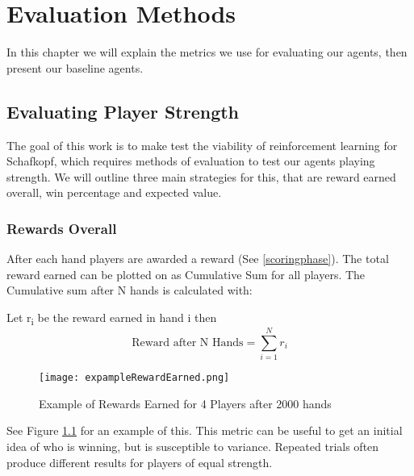 \chapter{Evaluation Methods}
In this chapter we will explain the metrics we use for evaluating our agents, then present our baseline agents.


\section{Evaluating Player Strength}
The goal of this work is to make test the viability of reinforcement learning for Schafkopf, which requires methods
of evaluation to test our agents playing strength.
We will outline three main strategies for this, that are reward earned overall, win percentage and expected value.

\subsection{Rewards Overall}
After each hand players are awarded a reward (See \ref{scoringphase}).
The total reward earned can be plotted on as Cumulative Sum for all players.
The Cumulative sum after N hands is calculated with:
\newline
\begin{center}
    Let r\textsubscript{i} be the reward earned in hand i then
    \begin{equation}
        \text{Reward after N Hands} = \sum_{i=1}^{N} r_{i}
    \end{equation}
\newline
    \begin{figure}[h]
    \centering
    \texttt{[image: expampleRewardEarned.png]}
    \caption{Example of Rewards Earned for 4 Players after 2000 hands}
    \label{fig:exampleCumSum}
    \end{figure}
\end{center}
See Figure \ref{fig:exampleCumSum} for an example of this.\newline
This metric can be useful to get an initial idea of who is winning, but is susceptible to variance.\newline
Repeated trials often produce different results for players of equal strength.


